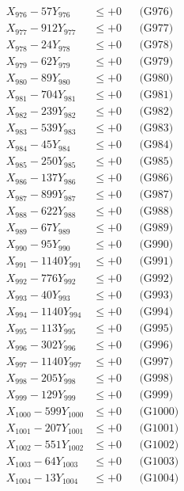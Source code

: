 \documentclass[a4paper,10pt]{article}
\begin{document}
{\begin{align}
X_{976} - 57Y_{976} &\leq +0 && \text{(G976)} \\
X_{977} - 912Y_{977} &\leq +0 && \text{(G977)} \\
X_{978} - 24Y_{978} &\leq +0 && \text{(G978)} \\
X_{979} - 62Y_{979} &\leq +0 && \text{(G979)} \\
X_{980} - 89Y_{980} &\leq +0 && \text{(G980)} \\
\allowbreak
X_{981} - 704Y_{981} &\leq +0 && \text{(G981)} \\
X_{982} - 239Y_{982} &\leq +0 && \text{(G982)} \\
X_{983} - 539Y_{983} &\leq +0 && \text{(G983)} \\
X_{984} - 45Y_{984} &\leq +0 && \text{(G984)} \\
X_{985} - 250Y_{985} &\leq +0 && \text{(G985)} \\
X_{986} - 137Y_{986} &\leq +0 && \text{(G986)} \\
X_{987} - 899Y_{987} &\leq +0 && \text{(G987)} \\
X_{988} - 622Y_{988} &\leq +0 && \text{(G988)} \\
X_{989} - 67Y_{989} &\leq +0 && \text{(G989)} \\
X_{990} - 95Y_{990} &\leq +0 && \text{(G990)} \\
\allowbreak
X_{991} - 1140Y_{991} &\leq +0 && \text{(G991)} \\
X_{992} - 776Y_{992} &\leq +0 && \text{(G992)} \\
X_{993} - 40Y_{993} &\leq +0 && \text{(G993)} \\
X_{994} - 1140Y_{994} &\leq +0 && \text{(G994)} \\
X_{995} - 113Y_{995} &\leq +0 && \text{(G995)} \\
X_{996} - 302Y_{996} &\leq +0 && \text{(G996)} \\
X_{997} - 1140Y_{997} &\leq +0 && \text{(G997)} \\
X_{998} - 205Y_{998} &\leq +0 && \text{(G998)} \\
X_{999} - 129Y_{999} &\leq +0 && \text{(G999)} \\
X_{1000} - 599Y_{1000} &\leq +0 && \text{(G1000)} \\
\allowbreak
X_{1001} - 207Y_{1001} &\leq +0 && \text{(G1001)} \\
X_{1002} - 551Y_{1002} &\leq +0 && \text{(G1002)} \\
X_{1003} - 64Y_{1003} &\leq +0 && \text{(G1003)} \\
X_{1004} - 13Y_{1004} &\leq +0 && \text{(G1004)} \\

\end{align}}
\end{document}

